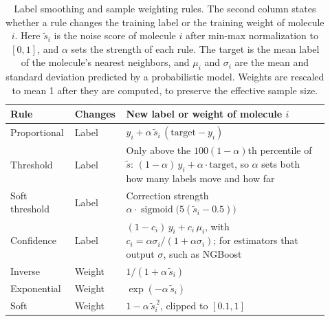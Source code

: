 \begin{table}[htbp]
\centering
\small
\caption[Label smoothing and sample weighting rules.]{Label smoothing and sample weighting rules. The second column states whether a rule changes the training label or the training weight of molecule $i$. Here $\tilde s_i$ is the noise score of molecule $i$ after min-max normalization to $[0, 1]$, and $\alpha$ sets the strength of each rule. The target is the mean label of the molecule's nearest neighbors, and $\mu_i$ and $\sigma_i$ are the mean and standard deviation predicted by a probabilistic model. Weights are rescaled to mean 1 after they are computed, to preserve the effective sample size.}
\label{tab:noise_corrections}
\begin{adjustbox}{max width=\textwidth}
\begin{tabular}{@{}P{0.17\linewidth}P{0.13\linewidth}P{0.62\linewidth}@{}}
\toprule
Rule & Changes & New label or weight of molecule $i$ \\
\midrule
Proportional & Label & $y_i + \alpha\,\tilde s_i\,(\text{target} - y_i)$ \\
Threshold & Label & Only above the $100(1-\alpha)$th percentile of $\tilde s$: $(1-\alpha)\,y_i + \alpha\cdot\text{target}$, so $\alpha$ sets both how many labels move and how far \\
Soft threshold & Label & Correction strength $\alpha \cdot \operatorname{sigmoid}\!\big(5(\tilde s_i - 0.5)\big)$ \\
Confidence & Label & $(1-c_i)\,y_i + c_i\,\mu_i$, with $c_i = \alpha\sigma_i / (1 + \alpha\sigma_i)$; for estimators that output $\sigma$, such as NGBoost \\
Inverse & Weight & $1 / (1 + \alpha\,\tilde s_i)$ \\
Exponential & Weight & $\exp(-\alpha\,\tilde s_i)$ \\
Soft & Weight & $1 - \alpha\,\tilde s_i^{\,2}$, clipped to $[0.1, 1]$ \\
\bottomrule
\end{tabular}
\end{adjustbox}
\end{table}

